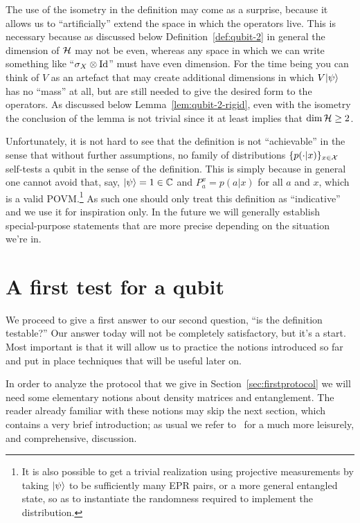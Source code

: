 The use of the isometry in the definition may come as a surprise, because it allows us to ``artificially'' extend the space in which the operators live. This is necessary because as discussed below Definition~\ref{def:qubit-2} in general the dimension of $\mathcal{H}$ may not be even, whereas any space in which we can write something like ``$\sigma_X\otimes \mathop{\rm Id}\nolimits$'' must have even dimension. For the time being you can think of $V$ as an artefact that may create additional dimensions in which $V|\psi\rangle$ has no ``mass'' at all, but are still needed to give the desired form to the operators. As discussed below Lemma~\ref{lem:qubit-2-rigid}, even with the isometry the conclusion of the lemma is not trivial since it at least implies that $\dim\mathcal{H}\geq 2$. 

Unfortunately, it is not hard to see that the definition is not ``achievable'' in the sense that without further assumptions, no family of distributions $\{p(\cdot|x)\}_{x\in \mathcal{X}}$ {self-tests a qubit} in the sense of the definition. This is simply because in general one cannot avoid that, say, $|\psi\rangle = 1 \in \mathbb{C}$ and $P^x_a = p(a|x)$ for all $a$ and $x$, which is a valid POVM.\footnote{It is also possible to get a trivial realization using projective measurements by taking $|\psi\rangle$ to be sufficiently many EPR pairs, or a more general entangled state, so as to instantiate the randomness required to implement the distribution.} As such one should only treat this definition as ``indicative'' and we use it for inspiration only. In the future we will generally establish special-purpose statements that are more precise depending on the situation we're in. 




\section{A first test for a qubit}
\label{sec:first-qubit}

We proceed to give a first answer to our second question, ``is the definition testable?'' Our answer today will not be completely satisfactory, but it's a start. Most important is that it will allow us to practice the notions introduced so far and  put in place techniques that will be useful later on. 

In order to analyze the protocol that we give in Section~\ref{sec:firstprotocol} we will need some elementary notions about density matrices and entanglement. The reader already familiar with these notions may skip the next section, which contains a very brief introduction; as usual we refer to~\cite{nielsen2002quantum} for a much more leisurely, and comprehensive, discussion. 

